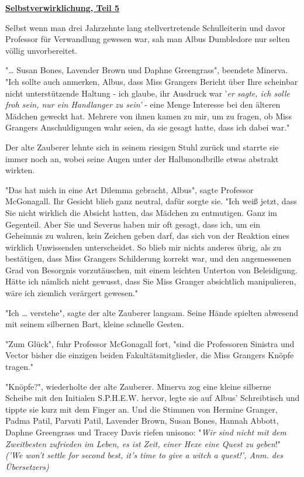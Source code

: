 

\hypertarget{selbstverwirklichung-teil-5}{%

\textbf{\uline{Selbstverwirklichung, Teil 5}}

Selbst wenn man drei Jahrzehnte lang stellvertretende Schulleiterin und davor Professor für Verwandlung gewesen war, sah man Albus Dumbledore nur selten völlig unvorbereitet.

"… Susan Bones, Lavender Brown und Daphne Greengrass", beendete Minerva. "Ich sollte auch anmerken, Albus, dass Miss Grangers Bericht über Ihre scheinbar nicht unterstützende Haltung - ich glaube, ihr Ausdruck war '\emph{er sagte, ich solle froh sein, nur ein Handlanger zu sein'} - eine Menge Interesse bei den älteren Mädchen geweckt hat. Mehrere von ihnen kamen zu mir, um zu fragen, ob Miss Grangers Anschuldigungen wahr seien, da sie gesagt hatte, dass ich dabei war."

Der alte Zauberer lehnte sich in seinem riesigen Stuhl zurück und starrte sie immer noch an, wobei seine Augen unter der Halbmondbrille etwas abstrakt wirkten.

"Das hat mich in eine Art Dilemma gebracht, Albus", sagte Professor McGonagall. Ihr Gesicht blieb ganz neutral, dafür sorgte sie. "Ich weiß jetzt, dass Sie nicht wirklich die Absicht hatten, das Mädchen zu entmutigen. Ganz im Gegenteil. Aber Sie und Severus haben mir oft gesagt, dass ich, um ein Geheimnis zu wahren, kein Zeichen geben darf, das sich von der Reaktion eines wirklich Unwissenden unterscheidet. So blieb mir nichts anderes übrig, als zu bestätigen, dass Miss Grangers Schilderung korrekt war, und den angemessenen Grad von Besorgnis vorzutäuschen, mit einem leichten Unterton von Beleidigung. Hätte ich nämlich nicht gewusst, dass Sie Miss Granger absichtlich manipulieren, wäre ich ziemlich verärgert gewesen."

"Ich … verstehe", sagte der alte Zauberer langsam. Seine Hände spielten abwesend mit seinem silbernen Bart, kleine schnelle Gesten.

"Zum Glück", fuhr Professor McGonagall fort, "sind die Professoren Sinistra und Vector bisher die einzigen beiden Fakultätsmitglieder, die Miss Grangers Knöpfe tragen."

"Knöpfe?", wiederholte der alte Zauberer. Minerva zog eine kleine silberne Scheibe mit den Initialen S.P.H.E.W. hervor, legte sie auf Albus' Schreibtisch und tippte sie kurz mit dem Finger an. Und die Stimmen von Hermine Granger, Padma Patil, Parvati Patil, Lavender Brown, Susan Bones, Hannah Abbott, Daphne Greengrass und Tracey Davis riefen unisono: "\emph{Wir sind nicht mit dem Zweitbesten zufrieden im Leben, es ist Zeit, einer Hexe eine Quest zu geben}!"\\ \emph{('We won't settle for second best, it's time to give a witch a quest!', Anm. des Übersetzers)}

}
